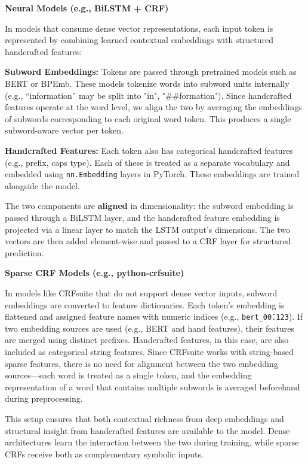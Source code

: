\textbf{Neural Models (e.g., BiLSTM + CRF)}

In models that consume dense vector representations, each input token is represented by combining learned contextual embeddings with structured handcrafted features:
\begin{compactitem}
\item \textbf{Subword Embeddings:} Tokens are passed through pretrained models such as BERT or BPEmb. These models tokenize words into subword units internally (e.g., “information” may be split into "in", "\#\#formation"). Since handcrafted features operate at the word level, we align the two by averaging the embeddings of subwords corresponding to each original word token. This produces a single subword-aware vector per token.
\item \textbf{Handcrafted Features:} Each token also has categorical handcrafted features (e.g., prefix, caps type). Each of these is treated as a separate vocabulary and embedded using \texttt{nn.Embedding} layers in PyTorch. These embeddings are trained alongside the model.
\end{compactitem}
The two components are \textbf{aligned} in dimensionality: the subword embedding is passed through a BiLSTM layer, and the handcrafted feature embedding is projected via a linear layer to match the LSTM output’s dimensions. The two vectors are then added element-wise and passed to a CRF layer for structured prediction.

\textbf{Sparse CRF Models (e.g., python-crfsuite)}

In models like CRFsuite that do not support dense vector inputs, subword embeddings are converted to feature dictionaries. Each token's embedding is flattened and assigned feature names with numeric indices (e.g., \texttt{bert\_0\=0.123}). If two embedding sources are used (e.g., BERT and hand features), their features are merged using distinct prefixes. Handcrafted features, in this case, are also included as categorical string features.
Since CRFsuite works with string-based sparse features, there is no need for alignment between the two embedding sources—each word is treated as a single token, and the embedding representation of a word that contains multiple subwords is averaged beforehand during preprocessing.

This setup ensures that both contextual richness from deep embeddings and structural insight from handcrafted features are available to the model. Dense architectures learn the interaction between the two during training, while sparse CRFs receive both as complementary symbolic inputs.

